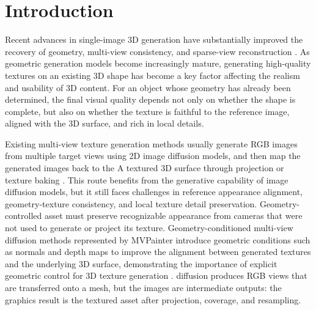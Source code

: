 \documentclass[times,twocolumn,final]{elsarticle}
\providecommand{\DIFadd}[1]{{\protect\color{blue} \sf #1}} %
\providecommand{\DIFdel}[1]{{\protect\color{red} \scriptsize #1}} %
\providecommand{\DIFaddbegin}{} %
\providecommand{\DIFaddend}{} %
\providecommand{\DIFdelbegin}{} %
\providecommand{\DIFdelend}{} %
\begin{document}
\DIFaddbegin \raggedbottom
\DIFaddend \linenumbers

\section{Introduction}
\label{sec:intro}

\DIFdelbegin \DIFdel{Recent advances in single-image 3D generation have substantially improved the recovery of geometry, multi-view consistency, and sparse-view reconstruction \cite{liu2023zero1to3,shi2023zero123pp,liu2023syncdreamer,long2023wonder3d,shi2024mvdream,wang2023imagedream,xu2024instantmesh,ke2024era3d}. As geometric generation models become increasingly mature, generating high-quality textures on an existing 3D shape has become a key factor affecting the realism and usability of 3D content. For an object whose geometry has already been determined, the final visual quality depends not only on whether the shape is complete, but also on whether the texture is faithful to the reference image, aligned with the 3D surface, and rich in local details. }%

\DIFdel{Existing multi-view texture generation methods usually generate RGB images from multiple target views using 2D image diffusion models, and then map the generated images back to the }\DIFdelend \DIFaddbegin \DIFadd{A textured }\DIFaddend 3D \DIFdelbegin \DIFdel{surface through projection or texture baking \cite{chen2023text2tex,richardson2023texture,poole2023dreamfusion,chen2023fantasia3d}. This route benefits from the generative capability of image diffusion models, but it still faces challenges in reference appearance alignment, geometry-texture consistency, and local texture detail preservation.
Geometry-controlled }\DIFdelend \DIFaddbegin \DIFadd{asset must preserve recognizable appearance from cameras that were not used to generate or project its texture. Geometry-conditioned }\DIFaddend multi-view \DIFdelbegin \DIFdel{diffusion methods represented by MVPainter introduce geometric conditions such as normals and depth maps to improve the alignment between generated textures and the underlying 3D surface, demonstrating the importance of explicit geometric control for 3D texture generation \cite{shao2025mvpainter}. }\DIFdelend \DIFaddbegin \DIFadd{diffusion produces RGB views that are transferred onto a mesh, but the images are intermediate outputs: the graphics result is the textured asset after projection, coverage, and resampling.
}\DIFaddend
\end{document}
